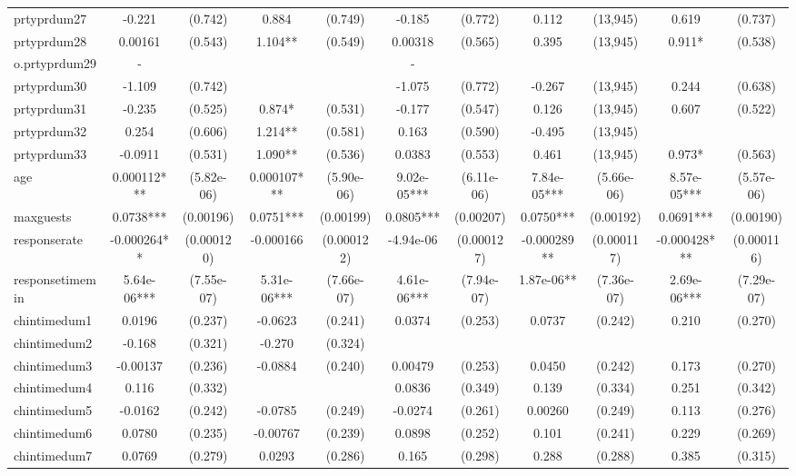 \documentclass[]{article}
\begin{document}
\begin{tabular}{lcccccccccc}
prtyprdum27 & -0.221 & (0.742) & 0.884 & (0.749) & -0.185 & (0.772) & 0.112 & (13,945) & 0.619 & (0.737) \\
prtyprdum28 & 0.00161 & (0.543) & 1.104** & (0.549) & 0.00318 & (0.565) & 0.395 & (13,945) & 0.911* & (0.538) \\
o.prtyprdum29 & - &  &  &  & - &  &  &  &  &  \\
prtyprdum30 & -1.109 & (0.742) &  &  & -1.075 & (0.772) & -0.267 & (13,945) & 0.244 & (0.638) \\
prtyprdum31 & -0.235 & (0.525) & 0.874* & (0.531) & -0.177 & (0.547) & 0.126 & (13,945) & 0.607 & (0.522) \\
prtyprdum32 & 0.254 & (0.606) & 1.214** & (0.581) & 0.163 & (0.590) & -0.495 & (13,945) &  &  \\
prtyprdum33 & -0.0911 & (0.531) & 1.090** & (0.536) & 0.0383 & (0.553) & 0.461 & (13,945) & 0.973* & (0.563) \\
age & 0.000112*** & (5.82e-06) & 0.000107*** & (5.90e-06) & 9.02e-05*** & (6.11e-06) & 7.84e-05*** & (5.66e-06) & 8.57e-05*** & (5.57e-06) \\
maxguests & 0.0738*** & (0.00196) & 0.0751*** & (0.00199) & 0.0805*** & (0.00207) & 0.0750*** & (0.00192) & 0.0691*** & (0.00190) \\
responserate & -0.000264** & (0.000120) & -0.000166 & (0.000122) & -4.94e-06 & (0.000127) & -0.000289** & (0.000117) & -0.000428*** & (0.000116) \\
responsetimemin & 5.64e-06*** & (7.55e-07) & 5.31e-06*** & (7.66e-07) & 4.61e-06*** & (7.94e-07) & 1.87e-06** & (7.36e-07) & 2.69e-06*** & (7.29e-07) \\
chintimedum1 & 0.0196 & (0.237) & -0.0623 & (0.241) & 0.0374 & (0.253) & 0.0737 & (0.242) & 0.210 & (0.270) \\
chintimedum2 & -0.168 & (0.321) & -0.270 & (0.324) &  &  &  &  &  &  \\
chintimedum3 & -0.00137 & (0.236) & -0.0884 & (0.240) & 0.00479 & (0.253) & 0.0450 & (0.242) & 0.173 & (0.270) \\
chintimedum4 & 0.116 & (0.332) &  &  & 0.0836 & (0.349) & 0.139 & (0.334) & 0.251 & (0.342) \\
chintimedum5 & -0.0162 & (0.242) & -0.0785 & (0.249) & -0.0274 & (0.261) & 0.00260 & (0.249) & 0.113 & (0.276) \\
chintimedum6 & 0.0780 & (0.235) & -0.00767 & (0.239) & 0.0898 & (0.252) & 0.101 & (0.241) & 0.229 & (0.269) \\
chintimedum7 & 0.0769 & (0.279) & 0.0293 & (0.286) & 0.165 & (0.298) & 0.288 & (0.288) & 0.385 & (0.315) \\

\end{tabular}
\end{document}
